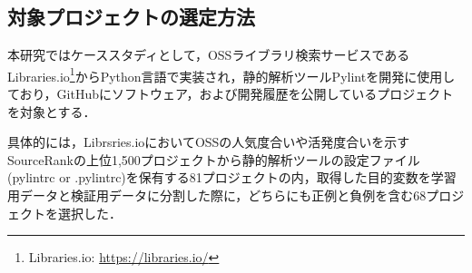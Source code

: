 \documentclass[11pt,dvipdfmx]{jreport}
\begin{document}
\subsection{対象プロジェクトの選定方法}
本研究ではケーススタディとして，OSSライブラリ検索サービスであるLibraries.io\footnote{Libraries.io: \url{https://libraries.io/}}からPython言語で実装され，静的解析ツールPylintを開発に使用しており，GitHubにソフトウェア，および開発履歴を公開しているプロジェクトを対象とする．

具体的には，Librsries.ioにおいてOSSの人気度合いや活発度合いを示すSourceRankの上位1,500プロジェクトから静的解析ツールの設定ファイル(pylintrc or .pylintrc)を保有する81プロジェクトの内，取得した目的変数を学習用データと検証用データに分割した際に，どちらにも正例と負例を含む68プロジェクトを選択した．
\end{document}
